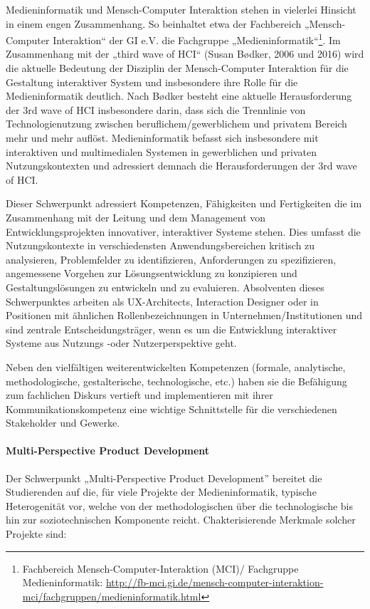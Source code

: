 Medieninformatik und Mensch-Computer Interaktion stehen in vielerlei
Hinsicht in einem engen Zusammenhang. So beinhaltet etwa der Fachbereich
„Mensch-Computer Interaktion`` der GI e.V. die Fachgruppe
„Medieninformatik``\footnote{Fachbereich Mensch-Computer-Interaktion
  (MCI)/ Fachgruppe Medieninformatik:
  \url{http://fb-mci.gi.de/mensch-computer-interaktion-mci/fachgruppen/medieninformatik.html}}.
Im Zusammenhang mit der „third wave of HCI`` (Susan Bødker, 2006 und
2016) wird die aktuelle Bedeutung der Disziplin der Mensch-Computer
Interaktion für die Gestaltung interaktiver System und insbesondere ihre
Rolle für die Medieninformatik deutlich. Nach Bødker besteht eine
aktuelle Herausforderung der 3rd wave of HCI insbesondere darin, dass
sich die Trennlinie von Technologienutzung zwischen
beruflichem/gewerblichem und privatem Bereich mehr und mehr auflöst.
Medieninformatik befasst sich insbesondere mit interaktiven und
multimedialen Systemen in gewerblichen und privaten Nutzungskontexten
und adressiert demnach die Herausforderungen der 3rd wave of HCI.

Dieser Schwerpunkt adressiert Kompetenzen, Fähigkeiten und Fertigkeiten
die im Zusammenhang mit der Leitung und dem Management von
Entwicklungsprojekten innovativer, interaktiver Systeme stehen. Dies
umfasst die Nutzungskontexte in verschiedensten Anwendungsbereichen
kritisch zu analysieren, Problemfelder zu identifizieren, Anforderungen
zu spezifizieren, angemessene Vorgehen zur Lösungsentwicklung zu
konzipieren und Gestaltungslösungen zu entwickeln und zu evaluieren.
Absolventen dieses Schwerpunktes arbeiten als UX-Architects, Interaction
Designer oder in Positionen mit ähnlichen Rollenbezeichnungen in
Unternehmen/Institutionen und sind zentrale Entscheidungsträger, wenn es
um die Entwicklung interaktiver Systeme aus Nutzungs -oder
Nutzerperspektive geht.

Neben den vielfältigen weiterentwickelten Kompetenzen (formale,
analytische, methodologische, gestalterische, technologische, etc.)
haben sie die Befähigung zum fachlichen Diskurs vertieft und
implementieren mit ihrer Kommunikationskompetenz eine wichtige
Schnittstelle für die verschiedenen Stakeholder und Gewerke.

\paragraph{Multi-Perspective Product
Development}\label{multi-perspective-product-development}

Der Schwerpunkt „Multi-Perspective Product Development'' bereitet die
Studierenden auf die, für viele Projekte der Medieninformatik, typische
Heterogenität vor, welche von der methodologischen über die
technologische bis hin zur soziotechnischen Komponente reicht.
Chakterisierende Merkmale solcher Projekte sind:

